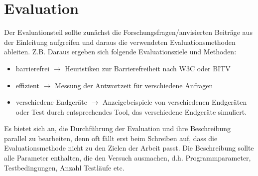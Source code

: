 
\chapter{Evaluation}
Der Evaluationsteil sollte zunächst die Forschungsfragen/anvisierten Beiträge aus der Einleitung aufgreifen und daraus die verwendeten Evaluationsmethoden ableiten. Z.B.  Daraus ergeben sich folgende Evaluationsziele und Methoden:
\begin{itemize}
  \item barrierefrei $\rightarrow$ Heuristiken zur Barrierefreiheit nach W3C oder BITV
  \item effizient $\rightarrow$ Messung der Antwortzeit für verschiedene Anfragen
  \item verschiedene Endgeräte $\rightarrow$ Anzeigebeispiele von verschiedenen Endgeräten oder Test durch entsprechendes Tool, das verschiedene Endgeräte simuliert.
\end{itemize}

Es bietet sich an, die Durchführung der Evaluation und ihre Beschreibung parallel zu bearbeiten, denn oft fällt erst beim Schreiben auf, dass die Evaluationsmethode nicht zu den Zielen der Arbeit passt. Die Beschreibung sollte alle Parameter enthalten, die den Versuch ausmachen, d.h. Programmparameter, Testbedingungen, Anzahl Testläufe etc.